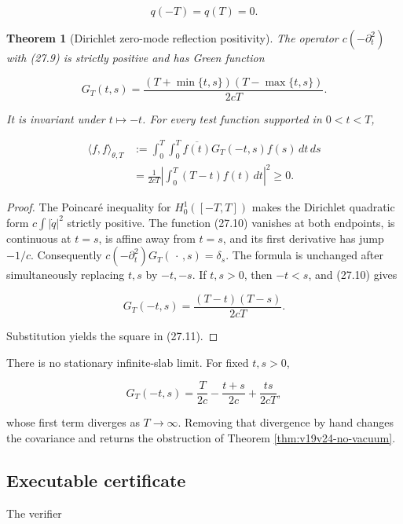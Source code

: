 \documentclass[11pt]{article}
\newtheorem{theorem}{Theorem}[section]
\theoremstyle{remark}
\begin{document}
\[
 q(-T)=q(T)=0.                                                 \tag{27.9}
\]

\begin{theorem}[Dirichlet zero-mode reflection positivity]
\label{thm:v19v24-dirichlet}
The operator \(c(-\partial_t^2)\) with (27.9) is strictly positive and
has Green function

\[
 G_T(t,s)=
 \frac{(T+\min\{t,s\})(T-\max\{t,s\})}{2cT}.                  \tag{27.10}
\]

It is invariant under \(t\mapsto-t\).  For every test function supported
in \(0<t<T\),

\[
 \begin{split}
 \langle f,f\rangle_{\theta,T}
 &:=\int_0^T\!\!\int_0^T
 \overline{f(t)}G_T(-t,s)f(s)\,dt\,ds\\
 &=\frac1{2cT}
 \left|\int_0^T(T-t)f(t)\,dt\right|^2\geq0.                  \tag{27.11}
 \end{split}
\]
\end{theorem}

\begin{proof}
The Poincaré inequality for \(H_0^1([-T,T])\) makes the Dirichlet
quadratic form \(c\int|\dot q|^2\) strictly positive.  The function
(27.10) vanishes at both endpoints, is continuous at \(t=s\), is affine
away from \(t=s\), and its first derivative has jump \(-1/c\).
Consequently \(c(-\partial_t^2)G_T(\,\cdot\,,s)=\delta_s\).
The formula is unchanged after simultaneously replacing \(t,s\) by
\(-t,-s\).  If \(t,s>0\), then \(-t<s\), and (27.10) gives

\[
 G_T(-t,s)=\frac{(T-t)(T-s)}{2cT}.                            \tag{27.12}
\]

Substitution yields the square in (27.11).
\end{proof}

There is no stationary infinite-slab limit.  For fixed \(t,s>0\),

\[
 G_T(-t,s)
 =\frac{T}{2c}-\frac{t+s}{2c}+\frac{ts}{2cT},                 \tag{27.13}
\]

whose first term diverges as \(T\to\infty\).  Removing that divergence by
hand changes the covariance and returns the obstruction of Theorem
\ref{thm:v19v24-no-vacuum}.

\subsection{Executable certificate}

The verifier
\end{document}
